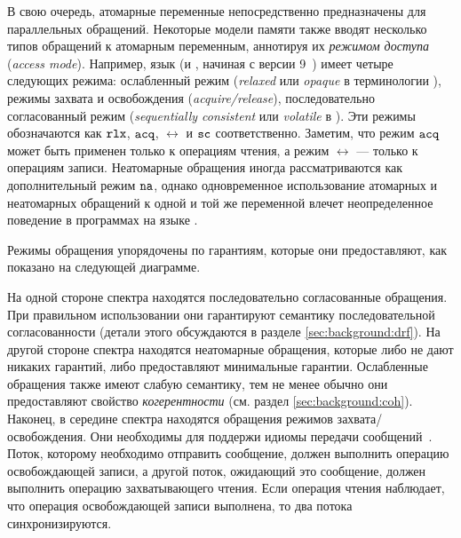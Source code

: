 В свою очередь, атомарные переменные непосредственно 
предназначены для параллельных обращений. 
Некоторые модели памяти также вводят 
несколько типов обращений к атомарным переменным, аннотируя их 
 \emph{режимом доступа} (\emph{access mode}).
Например, язык \CPP (и \Java, начиная с версии 9~\cite{Bender-Palsberg:OOPSLA19})
имеет четыре следующих режима: ослабленный режим
(\emph{relaxed} или \emph{opaque} в терминологии \Java),
режимы захвата и освобождения (\emph{acquire/release}), 
последовательно согласованный режим (\emph{sequentially consistent}
или  \emph{volatile} в \Java). 
Эти режимы обозначаются как $\mathtt{rlx}$, ${\mathtt{acq}}$, $\rel$ и ${\mathtt{sc}}$ соответственно.
Заметим, что режим ${\mathtt{acq}}$ может быть применен только к операциям чтения,
а режим $\rel$ --- только к операциям записи.
Неатомарные обращения иногда рассматриваются как дополнительный режим $\mathtt{na}$, 
однако  одновременное использование атомарных 
и неатомарных обращений к одной и той же переменной 
влечет неопределенное поведение в программах на языке \CPP.

Режимы обращения упорядочены по гарантиям, 
которые они предоставляют, как показано на следующей диаграмме. 




На одной стороне спектра находятся последовательно согласованные обращения.
При правильном использовании они гарантируют семантику 
последовательной согласованности
(детали этого обсуждаются в разделе \cref{sec:background:drf}).
На другой стороне  спектра находятся неатомарные обращения, которые либо не дают никаких гарантий, 
либо предоставляют минимальные гарантии. 
Ослабленные обращения также имеют слабую семантику, 
тем не менее обычно они предоставляют свойство \emph{когерентности}
(см. раздел \cref{sec:background:coh}).
Наконец, в середине спектра находятся обращения режимов захвата/освобождения. 
Они необходимы для поддержи идиомы передачи сообщений~\cite{Lahav-al:POPL16}.
Поток, которому необходимо отправить сообщение, должен выполнить операцию освобождающей записи, 
а другой поток, ожидающий это сообщение, должен выполнить операцию захватывающего чтения. 
Если операция чтения наблюдает, что  операция освобождающей записи выполнена, то два потока синхронизируются.

